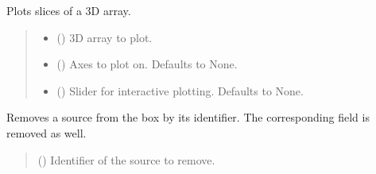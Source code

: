 \documentclass[letterpaper,10pt,english]{sphinxmanual}
\begin{document}
\begin{fulllineitems}
\begin{fulllineitems}
\end{fulllineitems}


\begin{fulllineitems}
\label{\detokenize{source/Box:Box.Box.plot_slices}}
\pysigstartsignatures
\pysiglinewithargsret
{}
{\sphinxparamcomma {}\sphinxparamcomma {}}
{}
\pysigstopsignatures
\sphinxAtStartPar
Plots slices of a 3D array.
\begin{quote}\begin{description}
\begin{itemize}
\item {} 
\sphinxAtStartPar
{} () \textendash{} 3D array to plot.

\item {} 
\sphinxAtStartPar
{} (\sphinxstyleliteralemphasis{\sphinxupquote{, }}) \textendash{} Axes to plot on. Defaults to None.

\item {} 
\sphinxAtStartPar
{} (\sphinxstyleliteralemphasis{\sphinxupquote{, }}) \textendash{} Slider for interactive plotting. Defaults to None.

\end{itemize}

\end{description}\end{quote}

\end{fulllineitems}


\begin{fulllineitems}
\label{\detokenize{source/Box:Box.Box.remove_source}}
\pysigstartsignatures
\pysiglinewithargsret
{}
{}
{}
\pysigstopsignatures
\sphinxAtStartPar
Removes a source from the box by its identifier. The corresponding field is removed as well.
\begin{quote}\begin{description}
\sphinxAtStartPar
{} () \textendash{} Identifier of the source to remove.


\end{description}
\end{quote}
\end{fulllineitems}
\end{fulllineitems}
\end{document}
